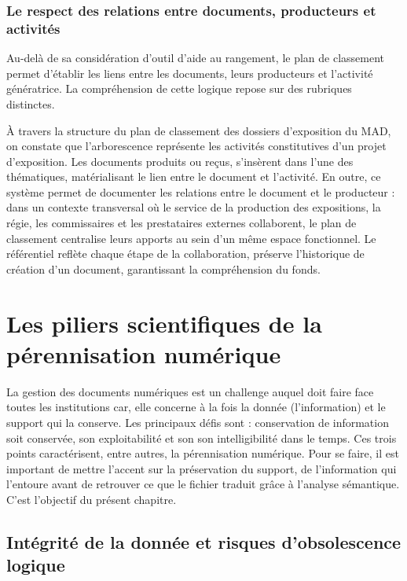 \subsection*{Le respect des relations entre documents, producteurs et activités}

Au-delà de sa considération d'outil d'aide au rangement, le plan de classement permet d'établir les liens entre les documents, leurs producteurs et l'activité génératrice. La compréhension de cette logique repose sur des rubriques distinctes. 

À travers la structure du plan de classement des dossiers d'exposition du MAD, on constate que l'arborescence représente les activités constitutives d'un projet d'exposition. Les documents produits ou reçus, s’insèrent dans l'une des thématiques, matérialisant le lien entre le document et l'activité. En outre, ce système permet de documenter les relations entre le document et le producteur : dans un contexte transversal où  le service de la production des expositions, la régie, les commissaires et les prestataires externes collaborent, le plan de classement centralise leurs apports au sein d'un même espace fonctionnel. Le référentiel reflète chaque étape de la collaboration, préserve l’historique de création d'un document, garantissant la compréhension du fonds.



\chapter{Les piliers scientifiques de la pérennisation numérique}

La gestion des documents numériques est un challenge auquel doit faire face toutes les institutions car, elle concerne à la fois la donnée (l'information) et le support qui la conserve. Les principaux défis sont :  conservation de  information soit conservée, son exploitabilité et son son intelligibilité dans le temps. Ces trois points caractérisent, entre autres, la pérennisation numérique. Pour se faire, il est important de mettre l'accent sur la préservation du support, de l'information qui l'entoure avant de retrouver ce que le fichier traduit grâce à l'analyse sémantique. C'est l'objectif du présent chapitre.


\section{Intégrité de la donnée et risques d'obsolescence logique}

